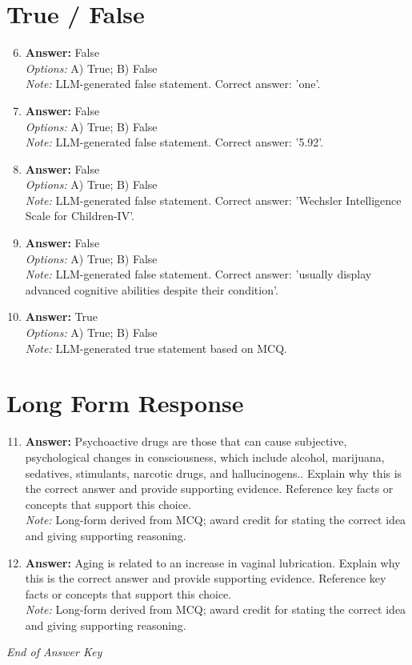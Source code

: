 \documentclass[12pt]{article}
\begin{document}
\section*{True / False}
\begin{enumerate}[label=\arabic*.]
\setcounter{enumi}{5}
\item \textbf{Answer:} False
\\ \textit{Options:} A) True; B) False
\\ \textit{Note:} LLM-generated false statement. Correct answer: 'one'.
\item \textbf{Answer:} False
\\ \textit{Options:} A) True; B) False
\\ \textit{Note:} LLM-generated false statement. Correct answer: '5.92'.
\item \textbf{Answer:} False
\\ \textit{Options:} A) True; B) False
\\ \textit{Note:} LLM-generated false statement. Correct answer: 'Wechsler Intelligence Scale for Children-IV'.
\item \textbf{Answer:} False
\\ \textit{Options:} A) True; B) False
\\ \textit{Note:} LLM-generated false statement. Correct answer: 'usually display advanced cognitive abilities despite their condition'.
\item \textbf{Answer:} True
\\ \textit{Options:} A) True; B) False
\\ \textit{Note:} LLM-generated true statement based on MCQ.
\end{enumerate}

\section*{Long Form Response}
\begin{enumerate}[label=\arabic*.]
\setcounter{enumi}{10}
\item \textbf{Answer:} Psychoactive drugs are those that can cause subjective, psychological changes in consciousness, which include alcohol, marijuana, sedatives, stimulants, narcotic drugs, and hallucinogens.. Explain why this is the correct answer and provide supporting evidence. Reference key facts or concepts that support this choice.
\\ \textit{Note:} Long-form derived from MCQ; award credit for stating the correct idea and giving supporting reasoning.
\item \textbf{Answer:} Aging is related to an increase in vaginal lubrication. Explain why this is the correct answer and provide supporting evidence. Reference key facts or concepts that support this choice.
\\ \textit{Note:} Long-form derived from MCQ; award credit for stating the correct idea and giving supporting reasoning.
\end{enumerate}

\vfill
\noindent\textit{End of Answer Key}
\end{document}
